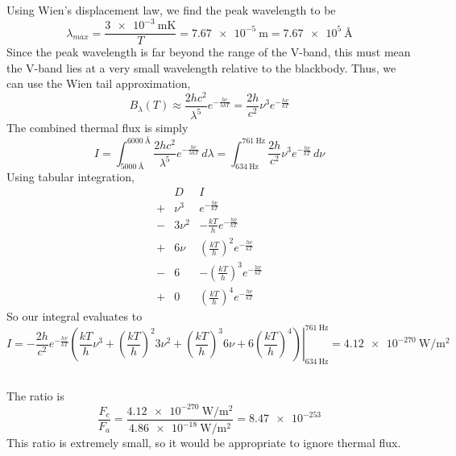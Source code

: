 \documentclass{article}
\begin{document}
Using Wien's displacement law, we find the peak wavelength to be
\begin{equation}
    \lambda_{max} = \frac{\SI{3e-3}{\meter\kelvin}}{T} = \SI{7.67e-5}{\meter} = \SI{7.67e+5}{\angstrom}
\end{equation}
Since the peak wavelength is far beyond the range of the V-band, this must mean the V-band lies at a very small wavelength relative to the blackbody.
Thus, we can use the Wien tail approximation,
\begin{equation}
    B_\lambda(T) \approx \frac{2hc^2}{\lambda^5} e^{-\frac{hc}{\lambda k T}} = \frac{2h}{c^2} \nu^3 e^{-\frac{h \nu}{k T}}
\end{equation}
The combined thermal flux is simply
\begin{equation}
    I = \int_{\SI{5000}{\angstrom}}^{\SI{6000}{\angstrom}} \frac{2hc^2}{\lambda^5} e^{-\frac{hc}{\lambda k T}} \, d\lambda = \int_{\SI{634}{\hertz}}^{\SI{761}{\hertz}} \frac{2h}{c^2} \nu^3 e^{-\frac{h \nu}{k T}} \, d\nu
\end{equation}
Using tabular integration,
\begin{equation}
    \begin{array}{c|c|c}
        & D & I \\
        \hline
        + & \nu^3 & e^{-\frac{h \nu}{k T}} \\
        - & 3\nu^2 & -\frac{k T}{h} e^{-\frac{h \nu}{k T}} \\
        + & 6\nu & \left(\frac{k T}{h}\right)^2 e^{-\frac{h \nu}{k T}} \\
        - & 6 & -\left(\frac{k T}{h}\right)^3 e^{-\frac{h \nu}{k T}} \\
        + & 0 & \left(\frac{k T}{h}\right)^4 e^{-\frac{h \nu}{k T}}
    \end{array}
\end{equation}
So our integral evaluates to
\begin{equation}
    I = \left.-\frac{2h}{c^2} e^{-\frac{h \nu}{k T}} \left(\frac{k T}{h} \nu^3 + \left(\frac{k T}{h}\right)^2 3\nu^2 + \left(\frac{k T}{h}\right)^3 6\nu + 6\left(\frac{k T}{h}\right)^4\right)\right|_{\SI{634}{\hertz}}^{\SI{761}{\hertz}} = \SI{4.12e-270}{\watt\per\meter\squared}
\end{equation}

\subsection{}

The ratio is
\begin{equation}
    \frac{F_c}{F_a} = \frac{\SI{4.12e-270}{\watt\per\meter\squared}}{\SI{4.86e-18}{\watt\per\meter\squared}} = \num{8.47e-253}
\end{equation}
This ratio is extremely small, so it would be appropriate to ignore thermal flux.
\end{document}
